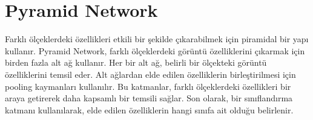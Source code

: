 \section{Pyramid Network}
Farklı ölçeklerdeki özellikleri etkili bir şekilde çıkarabilmek için piramidal bir yapı kullanır. Pyramid Network, farklı ölçeklerdeki görüntü özelliklerini çıkarmak için birden fazla alt ağ kullanır. Her bir alt ağ, belirli bir ölçekteki görüntü özelliklerini temsil eder. Alt ağlardan elde edilen özelliklerin birleştirilmesi için pooling kaymanları kullanılır. Bu katmanlar, farklı ölçeklerdeki özellikleri bir araya getirerek daha kapsamlı bir temsili sağlar. Son olarak, bir sınıflandırma katmanı kullanılarak, elde edilen özelliklerin hangi sınıfa ait olduğu belirlenir.

\newpage